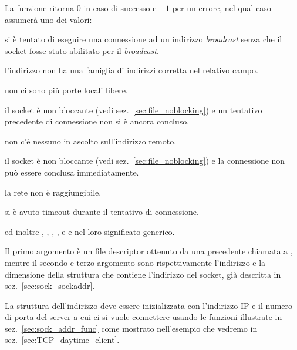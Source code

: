 \begin{funcproto}{
}

{La funzione ritorna $0$ in caso di successo e $-1$ per un errore, nel qual
  caso  assumerà uno dei valori: 
  \begin{errlist}
  \item[\errcode{EACCES}, \errcode{EPERM}] si è tentato di eseguire una
    connessione ad un indirizzo \textit{broadcast} senza che il socket fosse
    stato abilitato per il \textit{broadcast}.
  \item[\errcode{EAFNOSUPPORT}] l'indirizzo non ha una famiglia di indirizzi
    corretta nel relativo campo.
  \item[\errcode{EAGAIN}] non ci sono più porte locali libere. 
  \item[\errcode{EALREADY}] il socket è non bloccante (vedi
    sez.~\ref{sec:file_noblocking}) e un tentativo precedente di connessione
    non si è ancora concluso.
  \item[\errcode{ECONNREFUSED}] non c'è nessuno in ascolto sull'indirizzo
    remoto.
  \item[\errcode{EINPROGRESS}] il socket è non bloccante (vedi
    sez.~\ref{sec:file_noblocking}) e la connessione non può essere conclusa
    immediatamente.
  \item[\errcode{ENETUNREACH}] la rete non è raggiungibile.
  \item[\errcode{ETIMEDOUT}] si è avuto timeout durante il tentativo di
    connessione.
  \end{errlist}
  ed inoltre , , ,
  ,  e  e nel loro significato
  generico.}
\end{funcproto}

Il primo argomento è un file descriptor ottenuto da una precedente chiamata a
, mentre il secondo e terzo argomento sono rispettivamente
l'indirizzo e la dimensione della struttura che contiene l'indirizzo del
socket, già descritta in sez.~\ref{sec:sock_sockaddr}.

La struttura dell'indirizzo deve essere inizializzata con l'indirizzo IP e il
numero di porta del server a cui ci si vuole connettere usando le funzioni
illustrate in sez.~\ref{sec:sock_addr_func} come mostrato nell'esempio che
vedremo in sez.~\ref{sec:TCP_daytime_client}.

